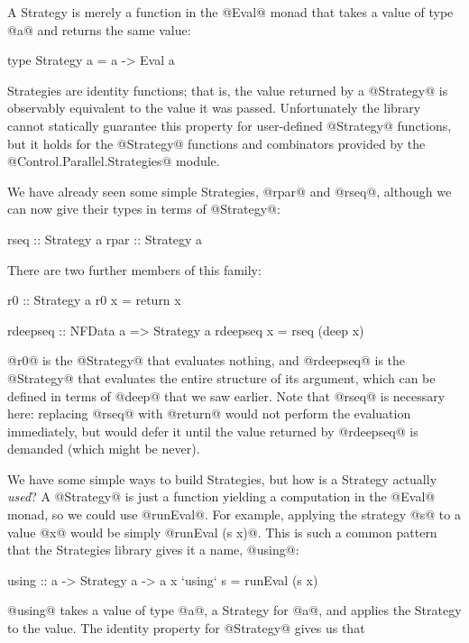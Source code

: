 A Strategy is merely a function in the @Eval@ monad that takes a value
of type @a@ and returns the same value:

\begin{haskell}
type Strategy a = a -> Eval a
\end{haskell}

\noindent Strategies are identity functions; that is, the value
returned by a @Strategy@ is observably equivalent to the value it was
passed.  Unfortunately the library cannot statically guarantee this
property for user-defined @Strategy@ functions, but it holds for the
@Strategy@ functions and combinators provided by the
@Control.Parallel.Strategies@ module.

We have already seen some simple Strategies, @rpar@ and @rseq@,
although we can now give their types in terms of @Strategy@:

\begin{haskell}
rseq :: Strategy a
rpar :: Strategy a
\end{haskell}

\noindent There are two further members of this family:

\begin{haskell}
r0 :: Strategy a
r0 x = return x

rdeepseq :: NFData a => Strategy a
rdeepseq x = rseq (deep x)
\end{haskell}

\noindent @r0@ is the @Strategy@ that evaluates nothing, and
@rdeepseq@ is the @Strategy@ that evaluates the entire structure of
its argument, which can be defined in terms of @deep@ that we saw
earlier.  Note that @rseq@ is necessary here: replacing @rseq@ with
@return@ would not perform the evaluation immediately, but would defer
it until the value returned by @rdeepseq@ is demanded (which might be
never).

We have some simple ways to build Strategies, but how is a Strategy
actually \emph{used}?  A @Strategy@ is just a function yielding a
computation in the @Eval@ monad, so we could use @runEval@.  For
example, applying the strategy @s@ to a value @x@ would be simply
@runEval (s x)@.  This is such a common pattern that the
Strategies library gives it a name, @using@:

\begin{haskell}
using :: a -> Strategy a -> a
x `using` s = runEval (s x)
\end{haskell}

\noindent @using@ takes a value of type @a@, a Strategy for @a@, and
applies the Strategy to the value.  The identity property for
@Strategy@ gives us that

